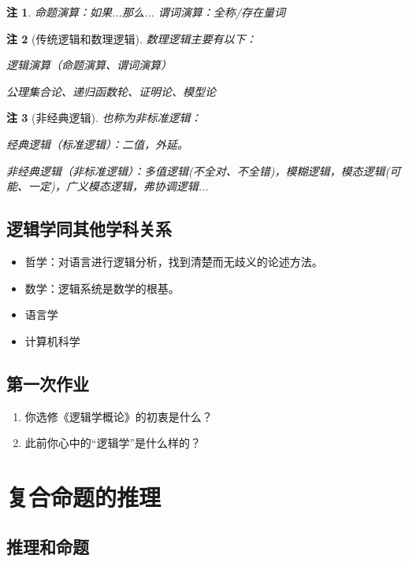 \documentclass[12pt,onecolumn,a4paper]{book}
\newtheorem*{note}{注}
\numberwithin{table}{subsection}
\numberwithin{equation}{subsection}
\begin{document}
\begin{note}
    命题演算：如果...那么... 谓词演算：全称/存在量词
\end{note}

\begin{note}[传统逻辑和数理逻辑]
    数理逻辑主要有以下：

    逻辑演算（命题演算、谓词演算）

    公理集合论、递归函数轮、证明论、模型论
\end{note}

\begin{note}[非经典逻辑]
    也称为非标准逻辑：

    经典逻辑（标准逻辑）：二值，外延。

    非经典逻辑（非标准逻辑）：多值逻辑(不全对、不全错)，模糊逻辑，模态逻辑(可能、一定)，广义模态逻辑，弗协调逻辑...
\end{note}

\section{逻辑学同其他学科关系}

\begin{itemize}[itemsep=0pt,parsep=0pt]
    \item 哲学：对语言进行逻辑分析，找到清楚而无歧义的论述方法。
    \item 数学：逻辑系统是数学的根基。
    \item 语言学
    \item 计算机科学
\end{itemize}

\section*{第一次作业}

\begin{enumerate}[itemsep=0pt,parsep=0pt]
    \item 你选修《逻辑学概论》的初衷是什么？
    \item 此前你心中的“逻辑学”是什么样的？
\end{enumerate}

\chapter{复合命题的推理}\label{chap2}

\section{推理和命题}
\end{document}
